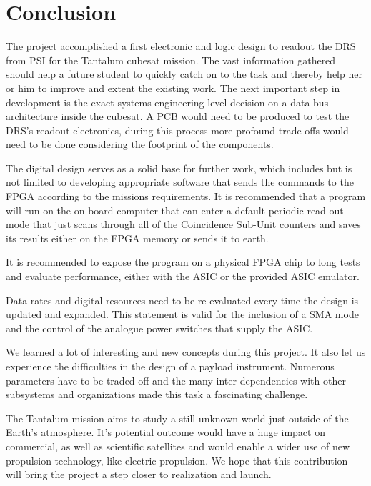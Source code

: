 \section{Conclusion}
\label{sec:conclusion}
The project accomplished a first electronic and logic design to readout the DRS from PSI for the Tantalum cubesat mission.
The vast information gathered should help a future student to quickly catch on to the task and thereby help her or him to improve and extent the existing work.
The next important step in development is the exact systems engineering level decision on a data bus architecture inside the cubesat.
A PCB would need to be produced to test the DRS's readout electronics, during this process more profound trade-offs would need to be done considering the footprint of the components.
\newline 

The digital design serves as a solid base for further work, which includes but is not limited to developing appropriate software that sends the commands to the FPGA according to the missions requirements. It is recommended that a program will run on the on-board computer that can enter a default periodic read-out mode that just scans through all of the Coincidence Sub-Unit counters and saves its results either on the FPGA memory or sends it to earth.

It is recommended to expose the program on a physical FPGA chip to long tests and evaluate performance, either with the ASIC or the provided ASIC emulator. 

Data rates and digital resources need to be re-evaluated every time the design is updated and expanded. This statement is valid for the inclusion of a SMA mode and the control of the analogue power switches that supply the ASIC.
\newline


We learned a lot of interesting and new concepts during this project.
It also let us experience the difficulties in the design of a payload instrument.
Numerous parameters have to be traded off and the many inter-dependencies with other subsystems and organizations made this task a fascinating challenge.
\newline

The Tantalum mission aims to study a still unknown world just outside of the Earth's atmosphere.
It's potential outcome would have a huge impact on commercial, as well as scientific satellites and would enable a wider use of new propulsion technology, like electric propulsion.
We hope that this contribution will bring the project a step closer to realization and launch.


